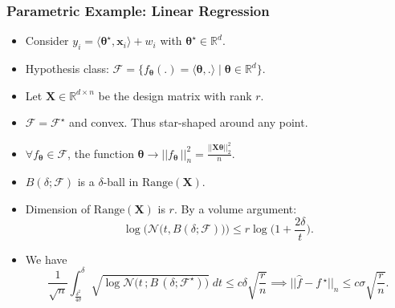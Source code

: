 \documentclass[11pt]{beamer}
\newcommand{\bx}{\mathbf{x}}
\newcommand{\cF}{\mathcal{F}}
\newcommand{\fstar}{f\,^\star}
\newcommand{\fhat}{\widehat{f}}
\begin{document}
		\begin{frame}
		\frametitle{Parametric Example: Linear Regression}
		\begin{itemize}
			\item Consider $y_i = \langle \boldsymbol{\theta^\star}, \bx_i \rangle + w_i$ with $\boldsymbol{\theta}^\star \in \mathbb{R}^d$.
			\item Hypothesis class: $\cF = \{f_{\boldsymbol{\theta}}(.) = \langle \boldsymbol{\theta}, . \rangle\;|\; \boldsymbol{\theta} \in \mathbb{R}^d\}$.
			\item Let $\mathbf{X} \in \mathbb{R}^{d \times n}$ be the design matrix with rank $r$.
			\item $\cF = \cF^\star$ and convex. Thus star-shaped around any point.			
			\item $\forall  f_{\boldsymbol{\theta}} \in \cF$, the function $\boldsymbol{\theta} \to  ||f_{\boldsymbol{\theta}}\,||_n^2 = \frac{||\mathbf{X}\boldsymbol{\theta}||_2^2}{n}$.
			
			\item $B(\delta; \cF)$ is a $\delta$-ball in $\mathrm{Range}(\mathbf{X})$. 
			\item
			Dimension of $\mathrm{Range}(\mathbf{X})$ is $r$. By a volume argument:
			\begin{equation*}
			\log\Big(\mathcal{N}\big(t, B(\delta; \cF)\big)\Big) \leq r \log\big(1 + \frac{2\delta}{t}\big).
			\end{equation*}
			\item We have
			\begin{equation*}
			\frac{1}{\sqrt{n}} \int_{\frac{\delta^2}{4\sigma}}^{\delta} \sqrt{\log \mathcal{N}\big(t\,; B\,(\delta; \cF^\star)\big)} \;dt \leq c\delta \sqrt{\frac{r}{n}} \implies ||\fhat - \fstar||_n \leq c\sigma\sqrt{\frac{r}{n}}.
			\end{equation*}
		\end{itemize}
	\end{frame}
\end{document}
